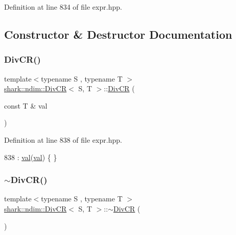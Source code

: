 Definition at line 834 of file expr.\+hpp.



\subsection{Constructor \& Destructor Documentation}
\hypertarget{classshark_1_1ndim_1_1_div_c_r_a69c14aeea0d6358da98c2a162fdd6415}{}\label{classshark_1_1ndim_1_1_div_c_r_a69c14aeea0d6358da98c2a162fdd6415} 
\subsubsection{\texorpdfstring{Div\+C\+R()}{DivCR()}}
{\footnotesize\ttfamily template$<$typename S , typename T $>$ \\
\hyperlink{classshark_1_1ndim_1_1_div_c_r}{shark\+::ndim\+::\+Div\+CR}$<$ S, T $>$\+::\hyperlink{classshark_1_1ndim_1_1_div_c_r}{Div\+CR} (\begin{DoxyParamCaption}\item[{const T \&}]{val }\end{DoxyParamCaption})\hspace{0.3cm}{\ttfamily [inline]}}



Definition at line 838 of file expr.\+hpp.


\begin{DoxyCode}
838 : \hyperlink{classshark_1_1ndim_1_1_div_c_r_ac37f8f30a7315b8f98e3d29bf59f2529}{val}(\hyperlink{classshark_1_1ndim_1_1_div_c_r_ac37f8f30a7315b8f98e3d29bf59f2529}{val}) \{ \}
\end{DoxyCode}
\hypertarget{classshark_1_1ndim_1_1_div_c_r_a1852e78a767faa136774cf9909226f6f}{}\label{classshark_1_1ndim_1_1_div_c_r_a1852e78a767faa136774cf9909226f6f} 
\subsubsection{\texorpdfstring{$\sim$\+Div\+C\+R()}{~DivCR()}}
{\footnotesize\ttfamily template$<$typename S , typename T $>$ \\
\hyperlink{classshark_1_1ndim_1_1_div_c_r}{shark\+::ndim\+::\+Div\+CR}$<$ S, T $>$\+::$\sim$\hyperlink{classshark_1_1ndim_1_1_div_c_r}{Div\+CR} (\begin{DoxyParamCaption}{ }\end{DoxyParamCaption})\hspace{0.3cm}{\ttfamily [inline]}}



